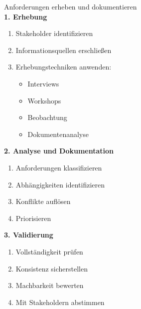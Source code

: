 \begin{KR}{Anforderungen erheben und dokumentieren}\\
\textbf{1. Erhebung}
\begin{enumerate}
    \item Stakeholder identifizieren
    \item Informationsquellen erschließen
    \item Erhebungstechniken anwenden:
    \begin{itemize}
        \item Interviews
        \item Workshops
        \item Beobachtung
        \item Dokumentenanalyse
    \end{itemize}
\end{enumerate}

\textbf{2. Analyse und Dokumentation}
\begin{enumerate}
    \item Anforderungen klassifizieren
    \item Abhängigkeiten identifizieren
    \item Konflikte auflösen
    \item Priorisieren
\end{enumerate}

\textbf{3. Validierung}
\begin{enumerate}
    \item Vollständigkeit prüfen
    \item Konsistenz sicherstellen
    \item Machbarkeit bewerten
    \item Mit Stakeholdern abstimmen
\end{enumerate}
\end{KR}

